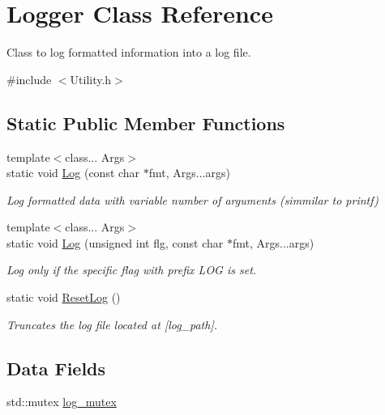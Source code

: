 \hypertarget{classLogger}{}\section{Logger Class Reference}
\label{classLogger}


Class to log formatted information into a log file.  




{\ttfamily \#include $<$Utility.\+h$>$}

\subsection*{Static Public Member Functions}
\begin{DoxyCompactItemize}
\item 
{\footnotesize template$<$class... Args$>$ }\\static void \hyperlink{classLogger_a2c06ab197bbd7db26e0308e28d835c8a}{Log} (const char $\ast$fmt, Args...\+args)
\begin{DoxyCompactList}\small\item\em Log formatted data with variable number of arguments (simmilar to printf) \end{DoxyCompactList}\item 
{\footnotesize template$<$class... Args$>$ }\\static void \hyperlink{classLogger_a15de55300771142efcb2d8c2eaddaa2d}{Log} (unsigned int flg, const char $\ast$fmt, Args...\+args)
\begin{DoxyCompactList}\small\item\em Log only if the specific flag with prefix L\+OG is set. \end{DoxyCompactList}\item 
static void \hyperlink{classLogger_aa6f73b6a87a95e784b2ebed4d47f2b19}{Reset\+Log} ()
\begin{DoxyCompactList}\small\item\em Truncates the log file located at \mbox{[}log\+\_\+path\mbox{]}. \end{DoxyCompactList}\end{DoxyCompactItemize}
\subsection*{Data Fields}
\begin{DoxyCompactItemize}
\item 
std\+::mutex \hyperlink{classLogger_ac92da3167ec7455dfe5599ca74f25be0}{log\+\_\+mutex}
\end{DoxyCompactItemize}
